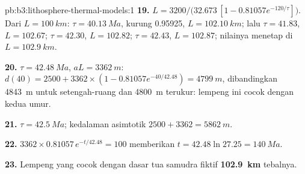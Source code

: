 \begin{solution}{pb:b3:lithosphere-thermal-models:1}
\textbf{19.} $L = 3200/\bigl(32.673\,[1 - 0.81057e^{-120/\tau}]\bigr)$. Dari
$L = \qty{100}{km}$: $\tau = \qty{40.13}{Ma}$, kurung 0.95925, $L =
\qty{102.10}{km}$; lalu $\tau = 41.83$, $L = 102.67$; $\tau = 42.30$, $L =
102.82$; $\tau = 42.43$, $L = 102.87$; nilainya menetap di $L = \qty{102.9}{km}$.

\textbf{20.} $\tau = \qty{42.48}{Ma}$, $aL = \qty{3362}{m}$: $d(40) = 2500 +
3362\times(1 - 0.81057e^{-40/42.48}) = \qty{4799}{m}$, dibandingkan \qty{4843}{m}
untuk setengah-ruang dan \qty{4800}{m} terukur: lempeng ini cocok dengan kedua umur.

\textbf{21.} $\tau = \qty{42.5}{Ma}$; kedalaman asimtotik $2500 + 3362 =
\qty{5862}{m}$.

\textbf{22.} $3362\times0.81057\,e^{-t/42.48} = 100$ memberikan $t = 42.48\ln27.25 =
\qty{140}{Ma}$.

\textbf{23.} Lempeng yang cocok dengan dasar tua samudra fiktif
\textbf{\qty[text-series-to-math=true]{102.9}{km}} tebalnya.
\end{solution}
